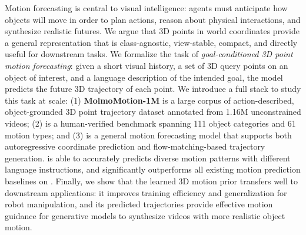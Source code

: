 

Motion forecasting is central to visual intelligence: agents must anticipate how objects will move in order to plan actions, reason about physical interactions, and synthesize realistic futures. We argue that 3D points in world coordinates provide a general representation that is class-agnostic, view-stable, compact, and directly useful for downstream tasks.
We formalize the task of \textit{goal-conditioned 3D point motion forecasting}: given a short visual history, a set of 3D query points on an object of interest, and a language description of the intended goal, the model predicts the future 3D trajectory of each point. We introduce a full stack to study this task at scale: (1) \textbf{MolmoMotion-1M} is a large corpus of action-described, object-grounded 3D point trajectory dataset annotated from 1.16M unconstrained videos; (2) \textbf{\benchmarkname{}} is a human-verified benchmark spanning 111 object categories and 61 motion types; and (3) \textbf{\modelname} is a general motion forecasting model that supports both autoregressive coordinate prediction and flow-matching-based trajectory generation. 
\modelname is able to accurately predicts diverse motion patterns with different language instructions, and significantly outperforms all existing motion prediction baselines on \benchmarkname{}. Finally, we show that the learned 3D motion prior transfers well to downstream applications: it improves training efficiency and generalization for robot manipulation, 
and its predicted trajectories provide effective motion guidance for generative models to synthesize videos with more realistic object motion.
